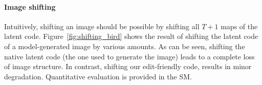 






\vspace{-0.4cm}
\paragraph{Image shifting}
Intuitively, shifting an image should be possible by shifting all $T+1$ maps of the latent code. %
Figure~\ref{fig:shifting_bird} shows the result of shifting the latent code of a model-generated image by various amounts. As can be seen, shifting the native latent code (the one used to generate the image) leads to a complete loss of image structure. In contrast, shifting our edit-friendly code, results in minor degradation. Quantitative evaluation is provided in the SM.%

